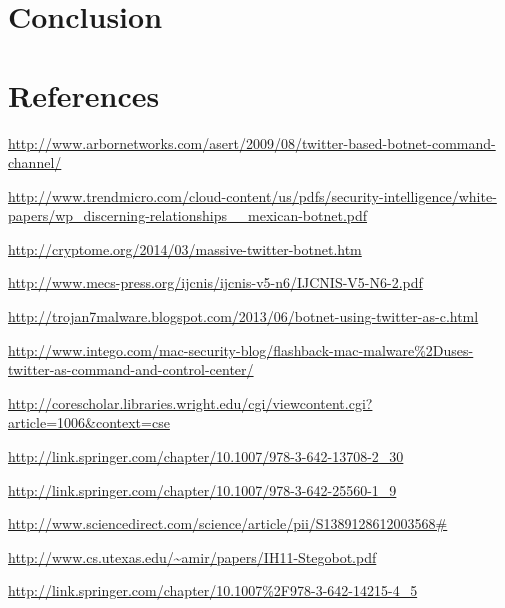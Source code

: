 \documentclass[11pt, oneside]{article} %
\numberwithin{equation}{section} %
\numberwithin{figure}{section} %
\numberwithin{table}{section} %
\begin{document}
\section{Conclusion}


\clearpage
\section{References}

\begingroup
\renewcommand{\section}[2]{}%
\begin{thebibliography}{99}

	\url{http://www.arbornetworks.com/asert/2009/08/twitter-based-botnet-command-channel/}

	\url{http://www.trendmicro.com/cloud-content/us/pdfs/security-intelligence/white-papers/wp_discerning-relationships__mexican-botnet.pdf}

	\url{http://cryptome.org/2014/03/massive-twitter-botnet.htm}

	\url{http://www.mecs-press.org/ijcnis/ijcnis-v5-n6/IJCNIS-V5-N6-2.pdf}

	\url{http://trojan7malware.blogspot.com/2013/06/botnet-using-twitter-as-c.html}

	\url{http://www.intego.com/mac-security-blog/flashback-mac-malware\%2Duses-twitter-as-command-and-control-center/}

	\url{http://corescholar.libraries.wright.edu/cgi/viewcontent.cgi?article=1006&context=cse}

	\url{http://link.springer.com/chapter/10.1007/978-3-642-13708-2_30}

	\url{http://link.springer.com/chapter/10.1007/978-3-642-25560-1_9}

	\url{http://www.sciencedirect.com/science/article/pii/S1389128612003568#}

	\url{http://www.cs.utexas.edu/~amir/papers/IH11-Stegobot.pdf}

	\url{http://link.springer.com/chapter/10.1007\%2F978-3-642-14215-4_5}

\end{thebibliography}

\endgroup
\end{document}
